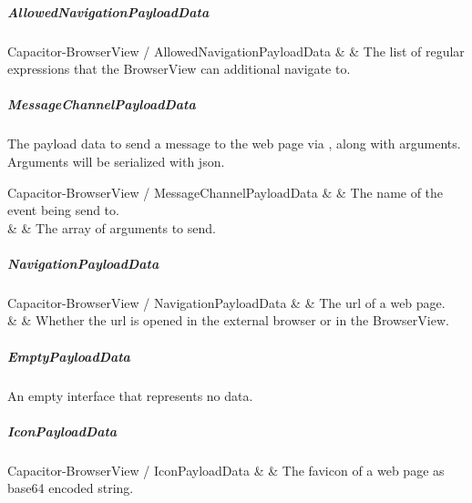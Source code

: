 
\newpage

\subparagraph{AllowedNavigationPayloadData}

\begin{interfacedesc}{Capacitor-BrowserView / AllowedNavigationPayloadData}
   &  & The list of regular expressions that the BrowserView can additional navigate to. \\ \hline
\end{interfacedesc}


\subparagraph{MessageChannelPayloadData}

The payload data to send a message to the web page via , along with arguments.
Arguments will be serialized with \ac{json}.

\begin{interfacedesc}{Capacitor-BrowserView / MessageChannelPayloadData}
   &  & The name of the event being send to. \\ \hline
        &   & The array of arguments to send. \\ \hline
\end{interfacedesc}


\subparagraph{NavigationPayloadData}

\begin{interfacedesc}{Capacitor-BrowserView / NavigationPayloadData}
          &   & The \ac{url} of a web page. \\ \hline
   &  & Whether the \ac{url} is opened in the external browser or in the BrowserView. \\ \hline
\end{interfacedesc}


\subparagraph{EmptyPayloadData}

An empty interface that represents no data.


\subparagraph{IconPayloadData}

\begin{interfacedesc}{Capacitor-BrowserView / IconPayloadData}
   &  & The favicon of a web page as base64 encoded string. \\ \hline
\end{interfacedesc}

